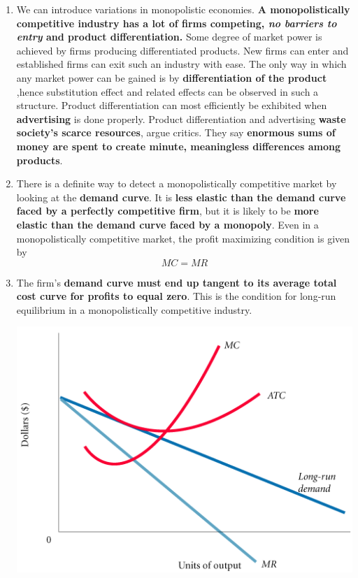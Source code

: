 \documentclass[12pt]{article}
\begin{document}
\begin{enumerate}
\item We can introduce variations in monopolistic economies. \textbf{A monopolistically competitive industry has a lot of firms competing, \textit{no barriers to entry} and product differentiation.} Some degree of market power is achieved by firms producing differentiated products.
New firms can enter and established firms can exit such an industry with ease. The only way in which any market power can be gained is by \textbf{differentiation of the product },hence substitution effect and related effects can be observed in such a structure.  Product differentiation can most efficiently be exhibited when \textbf{advertising} is done properly. Product differentiation and advertising \textbf{waste society's scarce resources}, argue critics. They say \textbf{enormous sums of money are spent to create minute, meaningless differences among products}.
\item There is a definite way to detect a monopolistically competitive market by looking at the \textbf{demand curve}. It is \textbf{less elastic than the demand curve faced by a perfectly competitive firm}, but it is likely to be \textbf{more elastic than the demand curve faced by a monopoly}. Even in a monopolistically competitive market, the profit maximizing condition is given by $$MC=MR$$
\item The firm's \textbf{demand curve must end up tangent to its average total cost curve for profits to equal zero}.  This is the condition for long-run equilibrium in a monopolistically competitive industry.
\begin{center}
\includegraphics[scale=0.5]{mcflre.png}
\end{center}











\end{enumerate}
\end{document}
